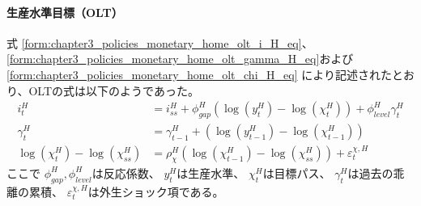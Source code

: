 \paragraph{生産水準目標（OLT）}
\label{sec:chapter5_beta_shock_policies_olt}
式
\eqref{form:chapter3_policies_monetary_home_olt_i_H_eq}、
\eqref{form:chapter3_policies_monetary_home_olt_gamma_H_eq}および
\eqref{form:chapter3_policies_monetary_home_olt_chi_H_eq}
により記述されたとおり、OLTの式は以下のようであった。
\begin{align}
\label{form:chapter5_beta_shock_policies_olt_i_H_eq}
    i_t^H&=i_{ss}^H+\phi_{gap}^H(\log(y_t^H)-\log(\chi_t^H))+\phi_{level}^H\gamma_t^H \\
\label{form:chapter5_beta_shock_policies_olt_gamma_H_eq}
    \gamma_t^H&=\gamma_{t-1}^H+(\log(y_{t-1}^H)-\log(\chi_{t-1}^H)) \\
\label{form:chapter5_beta_shock_policies_olt_chi_H_eq}
    \log(\chi_t^H)-\log(\chi_{ss}^H)&=\rho_{\chi}^H\left(\log(\chi_{t-1}^H)-\log(\chi_{ss}^H)\right)+\varepsilon_t^{\chi,H}
\end{align}
ここで
\(\phi_{gap}^H, \phi_{level}^H\)は反応係数、
\(y_t^H\)は生産水準、
\(\chi_t^H\)は目標パス、
\(\gamma_t^H\)は過去の乖離の累積、
\(\varepsilon_t^{\chi,H}\)は外生ショック項である。
